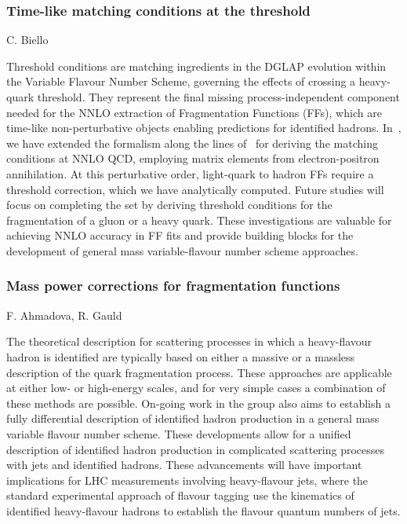 \documentclass{FBR_Bericht_2025}
\begin{document}
\begin{refsection}
\subsubsection{Time-like matching conditions at the threshold}
\begin{Namen}
C. Biello
\end{Namen}
Threshold conditions are matching ingredients in the DGLAP evolution within the Variable Flavour Number Scheme, governing the effects of crossing a heavy-quark threshold. They represent the final missing process-independent component needed for the NNLO extraction of Fragmentation Functions (FFs), which are time-like non-perturbative objects enabling predictions for identified hadrons. In~, we have extended the formalism along the lines of~ for deriving the matching conditions at NNLO QCD, employing matrix elements from electron-positron annihilation. At this perturbative order, light-quark to hadron FFs require a threshold correction, which we have analytically computed. Future studies will focus on completing the set by deriving threshold conditions for the fragmentation of a gluon or a heavy quark. These investigations are valuable for achieving NNLO accuracy in FF fits and provide building blocks for the development of general mass variable-flavour number scheme approaches.
%
\subsubsection{Mass power corrections for fragmentation functions}
\begin{Namen}
F. Ahmadova, R. Gauld
\end{Namen}
The theoretical description for scattering processes in which a heavy-flavour hadron is identified are typically based on either a massive or a massless description of the quark fragmentation process. These approaches are applicable at either low- or high-energy scales, and for very simple cases a combination of these methods are possible.
On-going work in the group also aims to establish a fully differential description of identified hadron production in a general mass variable flavour number scheme. These developments allow for a unified description of identified hadron production in complicated scattering processes with jets and identified hadrons.
These advancements will have important implications for LHC measurements involving heavy-flavour jets, where the standard experimental approach of flavour tagging use the kinematics of identified heavy-flavour hadrons to establish the flavour quantum numbers of jets.
%

\end{refsection}
\end{document}
